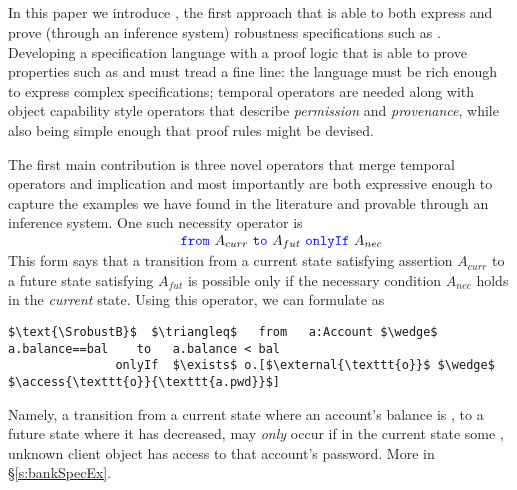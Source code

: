 \subsection{\Nec}
\label{intro:this:work}
{In this paper we introduce \Nec,} the first approach that is able to  both express and prove
(through an inference system)
robustness specifications such as  \SrobustB.
{Developing a specification language with a proof logic that is able to prove properties such as \SrobustB %
and must tread a fine line: the language must be rich enough to express complex specifications; temporal operators are needed along with object capability style operators 
that describe \emph{permission} and \emph{provenance}, while also being simple enough that proof rules might be devised.}


\vspace{.07in}
 {
The {first main} contribution  
{is} three novel operators that merge
temporal operators and implication 
and most importantly are both expressive enough to capture the 
examples we have found in the literature and provable through an inference system.
}
%
%
%  
 One such necessity operator is \\
$ 
\strut \hspace{1.7in} {\color{blue}\texttt{from}}\ A_{curr}\ {\color{blue}\texttt{to}}\ A_{fut}\ {\color{blue}\texttt{onlyIf}}\ A_{nec}
$  
\\
This form says that  
a  {transition} from a current state satisfying assertion $A_{curr}$ to a future
state satisfying $A_{fut}$  is possible only if  the   necessary 
condition
$A_{nec}$ holds in the \emph{current} state.
Using this operator, 
we can formulate  \SrobustB  
as
\begin{lstlisting}[language = Chainmail, mathescape=true, frame=lines]
   $\text{\SrobustB}$  $\triangleq$   from   a:Account $\wedge$ a.balance==bal    to   a.balance < bal
               onlyIf  $\exists$ o.[$\external{\texttt{o}}$ $\wedge$ $\access{\texttt{o}}{\texttt{a.pwd}}$]
\end{lstlisting}
Namely, a transition from a  {current} state where an account's balance is , to a  {future} state where 
it has decreased, may \emph{only} occur if  {in the current state} some {}, unknown client object  
has access to that account's password.
More    in \S\ref{s:bankSpecEx}. 
 

